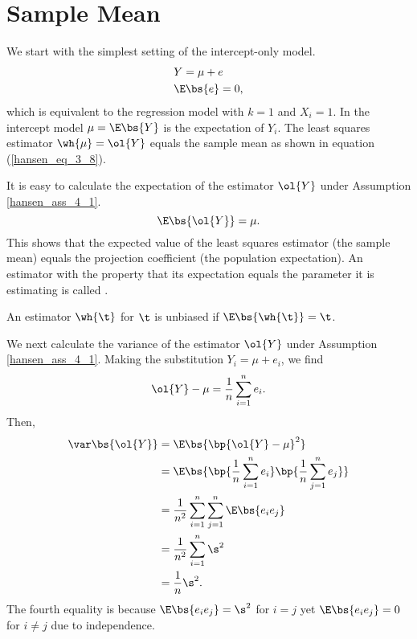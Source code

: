 \setcounter{section}{1}
\section{Sample Mean}

We start with the simplest setting of the intercept-only model.
\begin{equation}
    \notag 
    \begin{aligned}
        & Y = \mu + e \\
        & \E\bs{e} = 0,
    \end{aligned}
\end{equation}
which is equivalent to the regression model with $k=1$ and $X_i=1$. In the intercept model $\mu = \E\bs{Y}$ is the expectation of $Y_i$. The least squares estimator $\wh{\mu} = \ol{Y}$ equals the sample mean as shown in equation (\ref{hansen_eq_3_8}).

It is easy to calculate the expectation of the estimator $\ol{Y}$ under Assumption \ref{hansen_ass_4_1}.
\begin{equation}
    \notag 
    \E\bs{\ol{Y}} = \mu.
\end{equation}
This shows that the expected value of the least squares estimator (the sample mean) equals the projection coefficient (the population expectation). An estimator with the property that its expectation equals the parameter it is estimating is called .

\setcounter{definition}{0}
\begin{definition}
    An estimator $\wh{\t}$ for $\t$ is unbiased if $\E\bs{\wh{\t}} = \t$.
\end{definition}

We next calculate the variance of the estimator $\ol{Y}$ under Assumption \ref{hansen_ass_4_1}. Making the substitution $Y_i = \mu + e_i$, we find 
\begin{equation}
    \notag 
    \ol{Y} - \mu = \frac{1}{n} \sum_{i=1}^{n} e_i.
\end{equation} 
Then, 
\begin{equation}
    \notag 
    \begin{aligned}
        \var\bs{\ol{Y}} & = \E\bs{\bp{\ol{Y} - \mu}^2} \\
        & = \E\bs{\bp{\frac{1}{n} \sum_{i=1}^{n} e_i} \bp{\frac{1}{n} \sum_{j=1}^{n} e_j}} \\
        & = \frac{1}{n^2} \sum_{i=1}^{n} \sum_{j=1}^{n} \E\bs{e_i e_j} \\
        & = \frac{1}{n^2} \sum_{i=1}^{n} \s^2 \\
        & = \frac{1}{n} \s^2.
    \end{aligned}
\end{equation}
The fourth equality is because $\E\bs{e_i e_j} = \s^2$ for $i=j$ yet $\E\bs{e_i e_j} = 0$ for $i \neq j$ due to independence.

